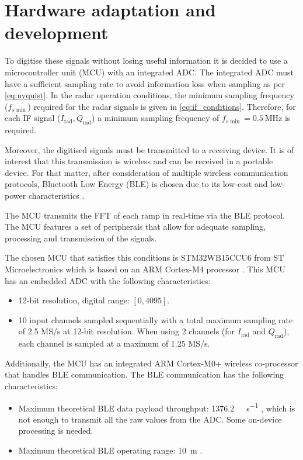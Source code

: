 \section{Hardware adaptation and development}
To digitise these signals without losing useful information it is decided to use a microcontroller unit (MCU) with an integrated ADC. The integrated ADC must have a sufficient sampling rate to avoid information loss when sampling as per \cref{eq:nyquist}. In the radar operation conditions, the minimum sampling frequency ($f_{s\min}$) required for the radar signals is given in \cref{eq:if_conditions}. Therefore, for each IF signal ($I_\mathrm{rad}, Q_\mathrm{rad}$) a minimum sampling frequency of $f_{s\min} = \SI{0.5}{\mega\hertz}$ is required.

Moreover, the digitised signals must be transmitted to a receiving device. It is of interest that this transmission is wireless and can be received in a portable device. For that matter, after consideration of multiple wireless communication protocols, Bluetooth Low Energy (BLE) is chosen due to its low-cost and low-power characteristics \cite{Gomez2012}.

The MCU transmits the FFT of each ramp in real-time via the BLE protocol. The MCU features a set of peripherals that allow for adequate sampling, processing and transmission of the signals. 

The chosen MCU that satisfies this conditions is STM32WB15CCU6 from ST Microelectronics which is based on an ARM Cortex-M4 processor \cite{STMicroelectronics2022}. This MCU has an embedded ADC with the following characteristics:
\begin{itemize}
	\item 12-bit resolution, digital range: $[0, 4095]$.
	\item 10 input channels sampled sequentially with a total maximum sampling rate of 2.5 MS/s at 12-bit resolution. When using 2 channels (for $I_\mathrm{rad}$ and $Q_\mathrm{rad}$), each channel is sampled at a maximum of 1.25 MS/s.
\end{itemize}

Additionally, the MCU has an integrated ARM Cortex-M0+ wireless co-processor that handles BLE communication. The BLE communication has the following characteristics:
\begin{itemize}
	\item Maximum theoretical BLE data payload throughput: \SI{1376.2}{\kilo\bit\per\second} \cite{NordicSemiconductor2019,Bluetooth52},  which is not enough to transmit all the raw values from the ADC. Some on-device processing is needed.
	\item Maximum theoretical BLE operating range: \SI{10}{\meter} \cite{Bluetooth52}.
\end{itemize}
